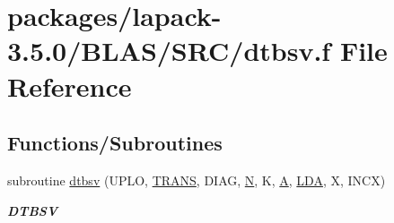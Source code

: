 \hypertarget{lapack-3_85_80_2BLAS_2SRC_2dtbsv_8f}{}\section{packages/lapack-\/3.5.0/\+B\+L\+A\+S/\+S\+R\+C/dtbsv.f File Reference}
\label{lapack-3_85_80_2BLAS_2SRC_2dtbsv_8f}
\subsection*{Functions/\+Subroutines}
\begin{DoxyCompactItemize}
\item 
subroutine \hyperlink{group__double__blas__level2_ga7edc75158ea82b6d06c4b847de6996fa}{dtbsv} (U\+P\+L\+O, \hyperlink{superlu__enum__consts_8h_a0c4e17b2d5cea33f9991ccc6a6678d62a1f61e3015bfe0f0c2c3fda4c5a0cdf58}{T\+R\+A\+N\+S}, D\+I\+A\+G, \hyperlink{polmisc_8c_a0240ac851181b84ac374872dc5434ee4}{N}, K, \hyperlink{classA}{A}, \hyperlink{example__user_8c_ae946da542ce0db94dced19b2ecefd1aa}{L\+D\+A}, X, I\+N\+C\+X)
\begin{DoxyCompactList}\small\item\em {\bfseries D\+T\+B\+S\+V} \end{DoxyCompactList}\end{DoxyCompactItemize}
